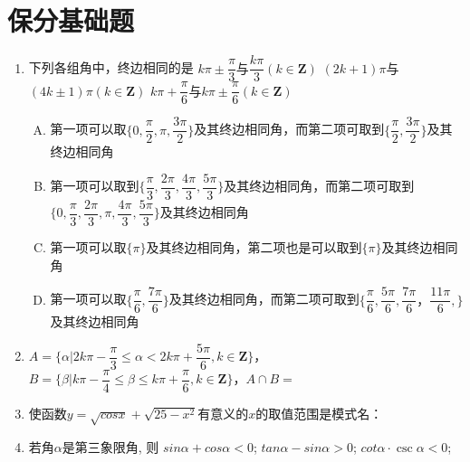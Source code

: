 \section*{保分基础题}
\begin{enumerate}
    \item 下列各组角中，终边相同的是
        {$k\pi \pm \dfrac{\pi}{3}$与$\dfrac{k\pi}{3} (k \in \mathbf{Z})$}
        {$(2k+1)\pi$与$(4k \pm 1)\pi (k \in \mathbf{Z})$}
        {$k\pi + \dfrac{\pi}{6}$与$k\pi \pm \dfrac{\pi}{6} (k \in \mathbf{Z})$}
        \begin{jieda}
            \begin{enumerate}[A.]
                \item 第一项可以取$\{0, \dfrac{\pi}{2}, \pi, \dfrac{3\pi}{2} \}$及其终边相同角，而第二项可取到$\{\dfrac{\pi}{2}, \dfrac{3\pi}{2}\}$及其终边相同角
                \item 第一项可以取到$\{\dfrac{\pi}{3}, \dfrac{2\pi}{3}, \dfrac{4\pi}{3},\dfrac{5\pi}{3}\}$及其终边相同角，而第二项可取到$\{0, \dfrac{\pi}{3}, \dfrac{2\pi}{3}, \pi, \dfrac{4\pi}{3},\dfrac{5\pi}{3}\}$及其终边相同角
                \item 第一项可以取$\{\pi\}$及其终边相同角，第二项也是可以取到$\{\pi\}$及其终边相同角
                \item 第一项可以取$\{\dfrac{\pi}{6}, \dfrac{7\pi}{6}\}$及其终边相同角，而第二项可取到$\{\dfrac{\pi}{6}, \dfrac{5\pi}{6}, \dfrac{7\pi}{6}，\dfrac{11\pi}{6},\}$及其终边相同角
            \end{enumerate}   
        \end{jieda}
        \item $A = \{\alpha | 2k\pi - \dfrac{\pi}{3} \leq \alpha < 2k\pi + \dfrac{5\pi}{6}, k \in \mathbf{Z}\}$， $B = \{\beta |k\pi - \dfrac{\pi}{4} \leq \beta \leq k\pi + \dfrac{\pi}{6}, k \in \mathbf{Z}\}$，$A \cap B = $
        \item 使函数$y=\sqrt{cos x}+\sqrt{25-x^{2}}$有意义的$x$的取值范围是模式名：
        \item 若角$\alpha$是第三象限角, 则
         $ sin\alpha+ cos\alpha<0$; 
         $ tan\alpha- sin\alpha>0$; 
         $ cot\alpha\cdot\csc\alpha<0$; 

\end{enumerate}
